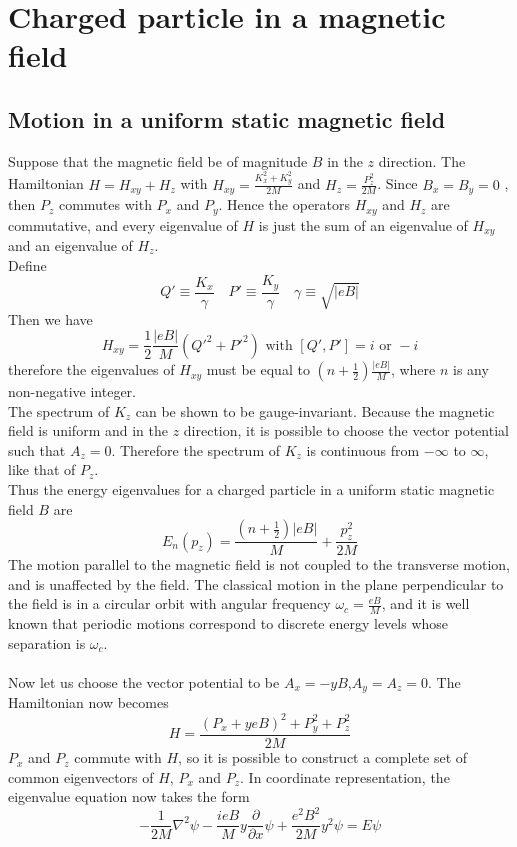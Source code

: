 \documentclass[cyan]{elegantnote}
\begin{document}
\section{Charged particle in a magnetic field}
\subsection{Motion in a uniform static magnetic field} 
Suppose that the magnetic field be of magnitude $B$ in the $z$ direction. The Hamiltonian $H = H_{xy}+H_z$ with $H_{xy} = \frac{K_x^2+K_y^2}{2M}$ and $H_z = \frac{P_z^2}{2M}$. Since $B_x = B_y = 0$ , then $P_z$ commutes with $P_x$ and $P_y$. Hence the operators $H_{xy}$ and $H_z$ are commutative, and every eigenvalue of $H$ is just
the sum of an eigenvalue of $H_{xy}$ and an eigenvalue of $H_z$. \\
Define
\[Q' \equiv \frac{K_x}{\gamma} \quad P' \equiv \frac{K_y}{\gamma} \quad \gamma \equiv \sqrt{|eB|} \]
Then we have
\[H_{xy} = \frac{1}{2} \frac{|eB|}{M}(Q'^2+P'^2) \mbox{  with  } [Q',P'] = i \mbox{  or  }-i\]
therefore the eigenvalues of $H_{xy}$ must be equal to $(n+\frac{1}{2})\frac{|eB|}{M}$, where $n$ is any non-negative integer.\\
The spectrum of $K_z$ can be shown to be gauge-invariant.
Because the magnetic field is uniform and in the $z$ direction, it is possible to choose the vector potential such that $A_z = 0$. Therefore the spectrum of $K_z$ is
continuous from $-\infty$ to $\infty$, like that of $P_z$.\\
Thus the energy eigenvalues for a charged particle in a uniform static magnetic field $B$ are
\[E_n(p_z) = \frac{(n+\frac{1}{2})|eB|}{M} + \frac{p_z^2}{2M}\]
The motion parallel to the magnetic field is not coupled to the transverse motion, and is unaffected by the field. The classical motion in the plane perpendicular to the field is
in a circular orbit with angular frequency $\omega_c = \frac{eB}{M}$, and it is well known that periodic motions correspond to discrete energy levels whose separation is $\omega_c$.\\ \\
Now let us choose the vector potential to be $A_x=-yB$,$A_y=A_z=0$. The Hamiltonian now becomes
\[H = \frac{(P_x+yeB)^2 + P_y^2 + P_z^2}{2M}\]
$P_x$ and $P_z$ commute with $H$, so it is possible to construct a complete set of common eigenvectors of $H$, $P_x$ and $P_z$. In coordinate representation, the eigenvalue equation now takes the form
\[-\frac{1}{2M}\nabla^2 \psi - \frac{ieB}{M}y\frac{\partial}{\partial x}\psi + \frac{e^2B^2}{2M}y^2\psi = E\psi\]
\end{document}
